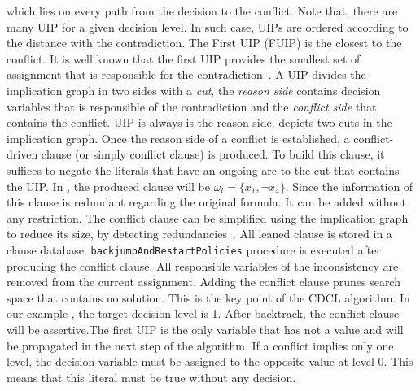 which lies on every path from the decision to the conflict. Note that, there are many UIP for a given decision level.
In such case, UIPs are ordered according to the distance with the contradiction. The First UIP (FUIP) is the closest to
the conflict. It is well known that the first UIP provides the smallest set of assignment that is responsible for the
contradiction~\cite{zhang2001efficient}.
A UIP divides the implication graph in two sides with a \emph{cut}, the \emph{reason side} contains decision variables 
that is responsible of the contradiction and the \emph{conflict side} that contains the conflict. 
 UIP is always is the 
reason side.  depicts two cuts in the implication graph.
Once the reason side of a conflict is established, a conflict-driven clause (or simply conflict clause) is produced.
To build this clause, it suffices to negate the
literals that have an ongoing arc to the  cut that contains the UIP. In , the produced
clause will be $\omega_l = \{x_1, \neg x_4 \}$. Since the information of this clause is redundant regarding 
the original formula. It can be added without any  restriction. The conflict clause can be simplified
using the implication graph to reduce its size, by detecting
redundancies~\cite{sorensson2009minimizing}. All leaned clause is stored in a clause database.
\texttt{backjumpAndRestartPolicies} procedure is executed after producing the conflict clause.
All responsible variables of the inconsistency are removed from the current assignment.
Adding the conflict clause prunes search space that contains no solution. This is the key point of the CDCL algorithm. In our example , the target decision level is 1.
After backtrack, the conflict clause will be assertive.The first UIP is the only variable that 
has not a value and will be propagated in the next step of the  algorithm.
If a conflict implies only one level, the decision variable must be assigned 
to the opposite value at level 0. This means that this literal must be true without any decision.
 
 
